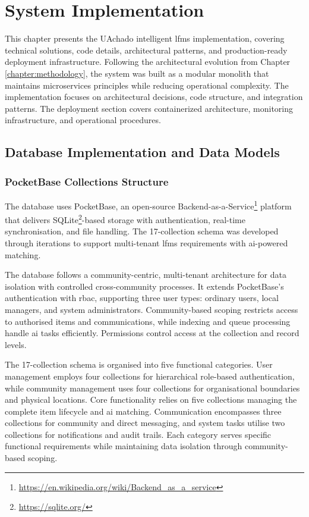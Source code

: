 \chapter{System Implementation} \label{chapter:implementation}

This chapter presents the UAchado intelligent \ac{lfms} implementation, covering technical solutions, code details, architectural patterns, and production-ready deployment infrastructure. Following the architectural evolution from Chapter \ref{chapter:methodology}, the system was built as a modular monolith that maintains microservices principles while reducing operational complexity. The implementation focuses on architectural decisions, code structure, and integration patterns. The deployment section covers containerized architecture, monitoring infrastructure, and operational procedures.


\section{Database Implementation and Data Models} \label{section:database_implementation}

\subsection{PocketBase Collections Structure} \label{subsection:pocketbase_collections}

The database uses PocketBase, an open-source Backend-as-a-Service\footnote{\url{https://en.wikipedia.org/wiki/Backend_as_a_service}} platform that delivers SQLite\footnote{\url{https://sqlite.org/}}-based storage with authentication, real-time synchronisation, and file handling. The 17-collection schema was developed through iterations to support multi-tenant \ac{lfms} requirements with \ac{ai}-powered matching.

The database follows a community-centric, multi-tenant architecture for data isolation with controlled cross-community processes. It extends PocketBase's authentication with \ac{rbac}, supporting three user types: ordinary users, local managers, and system administrators. Community-based scoping restricts access to authorised items and communications, while indexing and queue processing handle \ac{ai} tasks efficiently. Permissions control access at the collection and record levels.

The 17-collection schema is organised into five functional categories. User management employs four collections for hierarchical role-based authentication, while community management uses four collections for organisational boundaries and physical locations. Core functionality relies on five collections managing the complete item lifecycle and \ac{ai} matching. Communication encompasses three collections for community and direct messaging, and system tasks utilise two collections for notifications and audit trails. Each category serves specific functional requirements while maintaining data isolation through community-based scoping.

